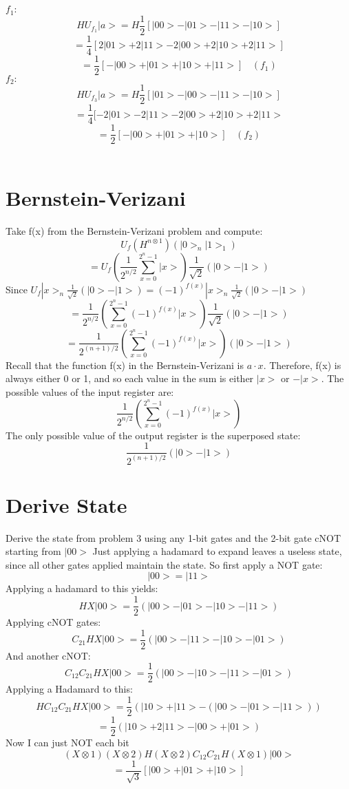 \documentclass[12pt]{article}
\begin{document}
\\\\
$f_{1}:$
$$ HU_{f_1}|a> = H \frac{1}{2}[|00> - |01> - |11> - |10>]  $$
$$ = \frac{1}{4}[2|01> + 2|11> - 2|00> + 2|10> + 2|11>] $$
\[
\boxed{ = \frac{1}{2}[-|00> + |01> + |10> + |11>] \>\>\>\> (f_{1}) }
\]
$f_{2}:$
$$ HU_{f_3} |a> = H \frac{1}{2}[|01> - |00> - |11> - |10>]$$
$$ = \frac{1}{4}[-2|01> - 2|11> - 2|00> + 2|10> + 2|11> $$
\[
\boxed{ = \frac{1}{2}[-|00> + |01> + |10>] \>\>\>\>(f_{2})}
\]\

\section{Bernstein-Verizani}

Take f(x) from the Bernstein-Verizani problem and compute:
$$U_{f}(H^{n \otimes 1})(|0>_{n}|1>_{1})$$
$$ = U_{f} (\frac{1}{2^{n/2}}\displaystyle\sum\limits_{x=0}^{2^{n} - 1} |x>) \frac{1}{\sqrt{2}}(|0> - |1>)$$
Since $ U_{f}|x>_{n} \frac{1}{\sqrt{2}}(|0>-|1>) = (-1)^{f(x)}|x>_{n} \frac{1}{\sqrt{2}}(|0> - |1>) $
$$ = \frac{1}{2^{n/2}} (\displaystyle\sum\limits_{x=0}^{2^{n} - 1} (-1)^{f(x)}|x>) \frac{1}{\sqrt{2}}(|0> - |1>) $$
\[
\boxed{ = \frac{1}{2^{(n+1)/2}} (\displaystyle\sum\limits_{x=0}^{2^{n} - 1} (-1)^{f(x)}|x>)(|0> - |1>)}
\]
Recall that the function f(x) in the Bernstein-Verizani is $ a \cdot x$. Therefore, f(x) is always either 0 or 1, and so each value in the sum is either $|x>$ or $-|x>$.
The possible values of the input register are:
\[
\boxed{\frac{1}{2^{n/2}} (\displaystyle\sum\limits_{x=0}^{2^{n} - 1} (-1)^{f(x)}|x>)}
\]
The only possible value of the output register is the superposed state:
\[
\boxed{ \frac{1}{2^{(n+1)/2}}(|0> - |1>)}
\]

\section{Derive State}
Derive the state from problem 3 using any 1-bit gates and the 2-bit gate cNOT starting from $|00>$
Just applying a hadamard to expand leaves a useless state, since all other gates applied maintain the state. So first apply a NOT gate:
$$|00> = |11>$$
Applying a hadamard to this yields:
$$HX|00> =  \frac{1}{2}(|00> - |01> - |10> - |11>)$$
Applying cNOT gates:
$$C_{21}HX|00> =  \frac{1}{2}(|00> - |11> - |10> - |01>)$$
And another cNOT:
$$C_{12}C_{21}HX|00> =  \frac{1}{2}(|00> - |10> - |11> - |01>)$$
Applying a Hadamard to this:
$$HC_{12}C_{21}HX|00> =  \frac{1}{2}(|10> + |11> - (|00> - |01> - |11>))$$
$$ = \frac{1}{2}(|10> + 2|11> - |00> + |01>)$$
Now I can just NOT each bit
$$(X \otimes 1)(X \otimes 2)H(X \otimes 2)C_{12}C_{21}H(X \otimes 1)|00> $$
\[
\boxed{=  \frac{1}{\sqrt{3}}[|00> + |01> + |10>]}
\]
\end{document}
